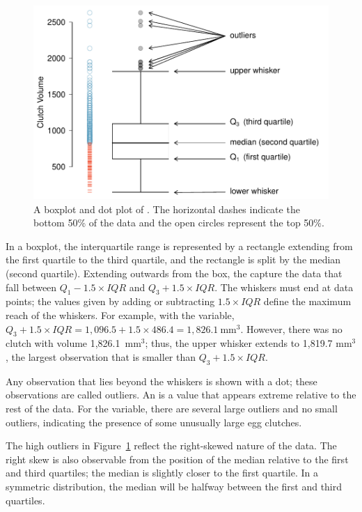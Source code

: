 \begin{figure}[th]
	\centering
	\includegraphics[width=0.95\mycaptionwidth]{ch_01a_intro_to_data_oi_biostat/figures/frogBoxPlot/frogBoxPlot}
	\caption{A boxplot and dot plot of . The horizontal dashes indicate the bottom 50\% of the data and the open circles represent the top 50\%.}
	\label{frogBoxPlot}
\end{figure}

\textD{\newpage}

In a boxplot, the interquartile range is represented by a rectangle extending from the first quartile to the third quartile, and the rectangle is split by the median (second quartile). Extending outwards from the box, the  capture the data that fall between $Q_1 - 1.5\times IQR$ and $Q_3 + 1.5\times IQR$. The whiskers must end at data points; the values given by adding or subtracting $1.5\times IQR$ define the maximum reach of the whiskers. For example, with the  variable, $Q_3 + 1.5 \times IQR = 1,096.5 + 1.5\times 486.4 = 1,826.1\ \textrm {mm}^{3}$. However, there was no clutch with volume 1,826.1\ $\textrm {mm}^{3}$; thus, the upper whisker extends to 1,819.7 $\textrm {mm}^{3}$, the largest observation that is smaller than $Q_3 + 1.5\times IQR$.

Any observation that lies beyond the whiskers is shown with a dot; these observations are called outliers. An  is a value that appears extreme relative to the rest of the data. For the  variable, there are several large outliers and no small outliers, indicating the presence of some unusually large egg clutches.

The high outliers in Figure~\ref{frogBoxPlot} reflect the right-skewed nature of the data. The right skew is also observable from the position of the median relative to the first and third quartiles; the median is slightly closer to the first quartile. In a symmetric distribution, the median will be halfway between the first and third quartiles.

